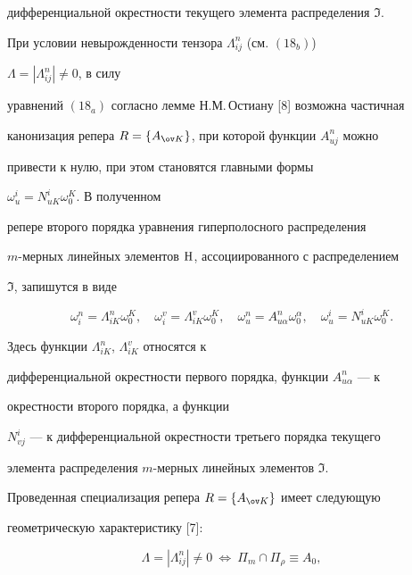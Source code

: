 дифференциальной окрестности текущего элемента распределения $\Im$. 


 


При условии невырожденности тензора $\Lambda^n_{ij}$ (см. $(18_b)$)


$\Lambda=|\Lambda^n_{ij}|\ne0$, в силу 


уравнений $(18_a)$ согласно лемме Н.М.\,Остиану [8] возможна частичная 


канонизация репера $R=\{A_{\ov K}\}$, при которой функции $A^n_{uj}$ можно 


привести к нулю, при этом становятся главными формы 


$\omega^i_u=N^i_{uK}\omega^K_0$. В полученном 


репере второго порядка уравнения гиперполосного распределения 


$m$-мерных линейных элементов $\mathrm H$, ассоциированного с распределением 


$\Im$, запишутся в виде 


\begin{equation} 


\omega^n_i=\Lambda^n_{iK}\omega^K_0,\quad \omega^v_i=\Lambda^v_{iK} 


\omega^K_0,\quad \omega^n_u=A^n_{u\alpha}\omega^\alpha_0,\quad 


\omega^i_u=N^i_{uK}\omega^K_0. 


\end{equation} 


Здесь функции $\Lambda^n_{iK}$, $\Lambda^v_{iK}$ относятся к 


дифференциальной окрестности первого порядка, функции $A^n_{u\alpha}$ --- к 


окрестности второго порядка, а функции 


$N^i_{vj}$ --- к дифференциальной окрестности третьего порядка текущего 


элемента распределения $m$-мерных линейных элементов $\Im$. 


 


Проведенная специализация репера $R=\{A_{\ov K}\}$ имеет следующую 


геометрическую характеристику [7]: 


$$ 


\Lambda=|\Lambda^n_{ij}|\ne0\ \Leftrightarrow \ \Pi_m 


\cap \Pi_\rho\equiv A_0, 


$$ 


